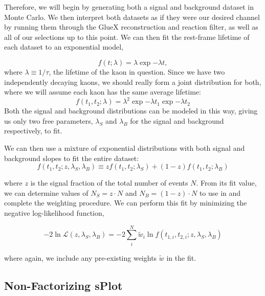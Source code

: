 Therefore, we will begin by generating both a signal and background dataset in Monte Carlo. We then interpret both datasets as if they were our desired channel by running them through the GlueX reconstruction and reaction filter, as well as all of our selections up to this point. We can then fit the rest-frame lifetime of each dataset to an exponential model,

\begin{equation}
  f(t; \lambda) = \lambda \exp{-\lambda t},
  \label{eq:splot-exponential}
\end{equation}
where $\lambda \equiv 1/\tau$, the lifetime of the kaon in question. Since we have two independently decaying kaons, we should really form a joint distribution for both, where we will assume each kaon has the same average lifetime:
\begin{equation}
  f(t_1, t_2; \lambda) = \lambda^2 \exp{-\lambda t_1}\exp{-\lambda t_2}
  \label{eq:splot-exponential_joint}
\end{equation}
Both the signal and background distributions can be modeled in this way, giving us only two free parameters, $\lambda_S$ and $\lambda_B$ for the signal and background respectively, to fit.

We can then use a mixture of exponential distributions with both signal and background slopes to fit the entire dataset:
\begin{equation}
  f(t_1, t_2; z, \lambda_S, \lambda_B) \equiv z f(t_1, t_2; \lambda_S) + (1-z) f(t_1, t_2; \lambda_B)
  \label{eq:splot-mixture}
\end{equation}

where $z$ is the signal fraction of the total number of events $N$. From its fit value, we can determine values of $N_S = z\cdot N$ and $N_B = (1-z)\cdot N$ to use in  and complete the weighting procedure. We can perform this fit by minimizing the negative log-likelihood function,

\begin{equation}
  -2\ln\mathcal{L}(z, \lambda_S, \lambda_B) = -2\sum_i^N \tilde{w}_i \ln f(t_{1,i}, t_{2,i}; z, \lambda_S, \lambda_B)
  \label{eq:splot-nll}
\end{equation}

where again, we include any pre-existing weights $\tilde{w}$ in the fit.

\subsection{Non-Factorizing sPlot}\label{sec:non-factorizing-splot}


